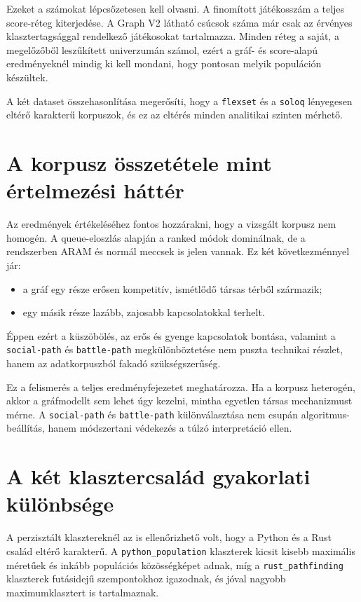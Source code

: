 ﻿\documentclass[a4paper,12pt]{report}
\begin{document}
Ezeket a számokat lépcsőzetesen kell olvasni. A finomított játékosszám a teljes score-réteg kiterjedése. A Graph V2 látható csúcsok száma már csak az érvényes klasztertagsággal rendelkező játékosokat tartalmazza. Minden réteg a saját, a megelőzőből leszűkített univerzumán számol, ezért a gráf- és score-alapú eredményeknél mindig ki kell mondani, hogy pontosan melyik populáción készültek.

A két dataset összehasonlítása megerősíti, hogy a \texttt{flexset} és a \texttt{soloq} lényegesen eltérő karakterű korpuszok, és ez az eltérés minden analitikai szinten mérhető.

\section{A korpusz összetétele mint értelmezési háttér}

Az eredmények értékeléséhez fontos hozzárakni, hogy a vizsgált korpusz nem homogén. A queue-eloszlás alapján a ranked módok dominálnak, de a rendszerben ARAM és normál meccsek is jelen vannak. Ez két következménnyel jár:

\begin{itemize}
    \item a gráf egy része erősen kompetitív, ismétlődő társas térből származik;
    \item egy másik része lazább, zajosabb kapcsolatokkal terhelt.
\end{itemize}

Éppen ezért a küszöbölés, az erős és gyenge kapcsolatok bontása, valamint a \texttt{social-path} és \texttt{battle-path} megkülönböztetése nem puszta technikai részlet, hanem az adatkorpuszból fakadó szükségszerűség.

Ez a felismerés a teljes eredményfejezetet meghatározza. Ha a korpusz heterogén, akkor a gráfmodellt sem lehet úgy kezelni, mintha egyetlen társas mechanizmust mérne. A \texttt{social-path} és \texttt{battle-path} különválasztása nem csupán algoritmus-beállítás, hanem módszertani védekezés a túlzó interpretáció ellen.

\section{A két klasztercsalád gyakorlati különbsége}

A perzisztált klasztereknél az is ellenőrizhető volt, hogy a Python és a Rust család eltérő karakterű. A \texttt{python\_population} klaszterek kicsit kisebb maximális méretűek és inkább populációs közösségképet adnak, míg a \texttt{rust\_pathfinding} klaszterek futásidejű szempontokhoz igazodnak, és jóval nagyobb maximumklasztert is tartalmaznak.
\end{document}
